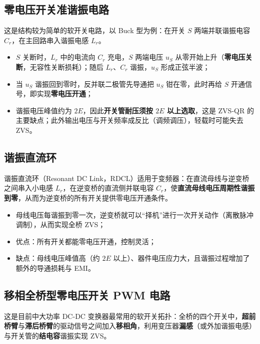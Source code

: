 \subsection{零电压开关准谐振电路}

这是结构较为简单的软开关电路，以 Buck 型为例：在开关 $S$ 两端并联谐振电容 $C_r$，在主回路串入谐振电感 $L_r$。

\begin{itemize}
  \item $S$ 关断时，$L_r$ 中的电流向 $C_r$ 充电，$S$ 两端电压 $u_S$ 从零开始上升（\textbf{零电压关断}，无容性关断损耗）；随后 $L_r$、$C_r$ 谐振，$u_S$ 形成正弦半波；
  \item 当 $u_S$ 谐振回到零时，反并联二极管先导通把 $u_S$ 钳在零，此时再给 $S$ 开通信号，即实现\textbf{零电压开通}；
  \item 谐振电压峰值约为 $2E$，因此\textbf{开关管耐压须按 $2E$ 以上选取}，这是 ZVS-QR 的主要缺点；此外输出电压与开关频率成反比（调频调压），轻载时可能失去 ZVS。
\end{itemize}

\subsection{谐振直流环}

谐振直流环（Resonant DC Link，RDCL）适用于变频器：在直流母线与逆变桥之间串入小电感 $L_r$，在逆变桥的直流侧并联电容 $C_r$，使\textbf{直流母线电压周期性谐振到零}，从而为逆变桥的所有开关提供零电压开通条件。

\begin{itemize}
  \item 母线电压每谐振到零一次，逆变桥就可以“择机”进行一次开关动作（离散脉冲调制），从而实现全桥 ZVS；
  \item 优点：所有开关都能零电压开通，控制灵活；
  \item 缺点：母线电压峰值高（约 $2E$ 以上）、器件电压应力大，且谐振过程增加了额外的导通损耗与 EMI。
\end{itemize}

\subsection{移相全桥型零电压开关 PWM 电路}

这是目前中大功率 DC-DC 变换器最常用的软开关拓扑：全桥的四个开关中，\textbf{超前桥臂}与\textbf{滞后桥臂}的驱动信号之间加入\textbf{移相角}，利用变压器\textbf{漏感}（或外加谐振电感）与开关管的\textbf{结电容}谐振实现 ZVS。

